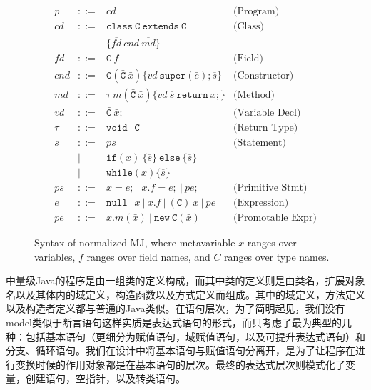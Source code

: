 \begin{figure}[ht]
\[
\begin{array}{ccll}
p 	&::=& \overline{cd}& \text{(Program)} \\
cd 	&::=& \mathtt{class}~\mathtt{C}~\mathtt{extends}~\mathtt{C}  &
                                                       \text{(Class)}\\
  && \{\overline{fd}~cnd~\overline{md}\}&\\
fd 	&::=& \mathtt{C}~f & \text{(Field)}\\
cnd\!\! &::=& \mathtt{C}(\bar{\mathtt{C}}~\bar{x})\{vd~\mathtt{super}(\bar{e});\overline{s}\} & \text{(Constructor)}\\
md 	&::=& \tau~m(\bar{\mathtt{C}}~\bar{x})\{vd~\overline{s}~\mathtt{return}~x;\} & \text{(Method)}\\
vd 	&::=& \bar{\mathtt{C}}~\bar{x}; & \text{(Variable Decl)}\\
\tau &::=& \mathtt{void} ~|~ \mathtt{C} & \text{(Return Type)}\\
s 	&::=& ps & \text{(Statement)}\\
	& | & \mathtt{if}(x)~\{\overline{s}\}~\mathtt{else}~\{\overline{s}\}\\
	& | & \mathtt{while}(x)\{\overline{s}\} \\
ps 	&::=& x=e; ~|~ x.f=e; ~|~ pe; & \text{(Primitive Stmt})\\
e 	&::=& \mathtt{null} ~|~ x ~|~ x.f ~|~ (\mathtt{C})~x ~|~ pe & \text{(Expression)}\\
pe 	&::=& x.m(\bar{x}) ~|~ \mathtt{new}~\mathtt{C}(\bar{x}) &
                                                          \text{(Promotable Expr)}
\end{array}
\] 

\caption{Syntax of normalized MJ, where metavariable $x$ ranges over variables, $f$ ranges over field names, and $C$
ranges over type names.}
\label{mj-syntax}
\end{figure}

中量级Java的程序是由一组类的定义构成，而其中类的定义则是由类名，扩展对象名以及其体内的域定义，构造函数以及方式定义而组成。其中的域定义，方法定义以及构造者定义都与普通的Java类似。在语句层次，为了简明起见，我们没有model类似于断言语句这样实质是表达式语句的形式，而只考虑了最为典型的几种：包括基本语句（更细分为赋值语句，域赋值语句，以及可提升表达式语句）和分支、循环语句。我们在设计中将基本语句与赋值语句分离开，是为了让程序在进行变换时候的作用对象都是在基本语句的层次。最终的表达式层次则模式化了变量，创建语句，空指针，以及转类语句。

